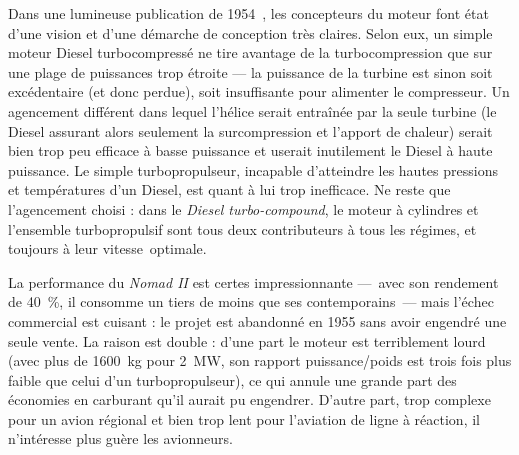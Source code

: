 Dans une lumineuse publication de 1954~\cite{sammonschatterton1955}, les concepteurs du moteur font état d’une vision et d’une démarche de conception très claires. Selon eux, un simple moteur Diesel turbocompressé ne tire avantage de la turbocompression que sur une plage de puissances trop étroite — la puissance de la turbine est sinon soit excédentaire (et donc perdue), soit insuffisante pour alimenter le compresseur. Un agencement différent dans lequel l’hélice serait entraînée par la seule turbine (le Diesel assurant alors seulement la surcompression et l’apport de chaleur) serait bien trop peu efficace à basse puissance et userait inutilement le Diesel à haute puissance. Le simple turbopropulseur, incapable d’atteindre les hautes pressions et températures d’un Diesel, est quant à lui trop inefficace. Ne reste que l’agencement choisi : dans le \textit{Diesel turbo-compound}, le moteur à cylindres et l’ensemble turbopropulsif sont tous deux contributeurs à tous les régimes, et toujours à leur vitesse~\mbox{optimale}. 

La performance du \textit{Nomad II} est certes impressionnante —\ avec son rendement de \SI{40}{\percent}, il consomme un tiers de moins que ses contemporains\ — mais l’échec commercial est cuisant : le projet est abandonné en 1955 sans avoir engendré une seule vente. La raison est double : d’une part le moteur est terriblement lourd (avec plus de \SI{1600}{\kilogram} pour \SI{2}{\mega\watt}, son rapport puissance/poids est trois fois plus faible que celui d’un turbopropulseur), ce qui annule une grande part des économies en carburant qu’il aurait pu engendrer. D’autre part, trop complexe pour un avion régional et bien trop lent pour l’aviation de ligne à réaction, il n’intéresse plus guère les avionneurs.

